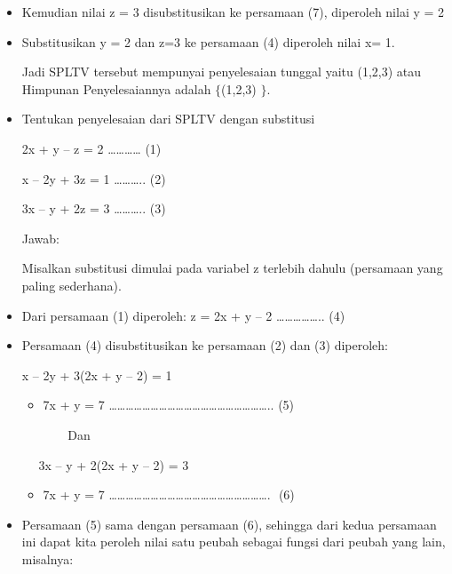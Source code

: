\documentclass[11pt,fleqn]{book} %
\begin{document}
\begin{myEnumerate}
	\noindent 
	\begin{itemize}
		\item Kemudian nilai z = 3 disubstitusikan ke persamaan (7), diperoleh nilai y = 2 \par
		\noindent 
		\item Substitusikan y = 2 dan z=3 ke persamaan (4) diperoleh nilai x= 1. \par
		\noindent 
		Jadi SPLTV tersebut mempunyai penyelesaian tunggal yaitu (1,2,3) atau Himpunan Penyelesaiannya adalah  $  \{  $(1,2,3) $  \}  $. \par
		\vspace{12pt}
		\vspace{12pt}
		\noindent 
		\item Tentukan penyelesaian dari SPLTV dengan substitusi \par
		2x + y – z = 2 ………… (1) \par
		x – 2y + 3z = 1 ……….. (2) \par
		3x – y + 2z = 3 ……….. (3) \par
		\noindent 
		Jawab: \par
		\noindent 
		Misalkan substitusi dimulai pada variabel z terlebih dahulu (persamaan yang paling sederhana). \par
		\noindent 
		\item Dari persamaan (1) diperoleh: z = 2x + y – 2 …………….. (4) \par
		\noindent 
		\item Persamaan (4) disubstitusikan ke persamaan (2) dan (3) diperoleh: \par
		x – 2y + 3(2x + y – 2) = 1 \par
		\begin{itemize}
			\item 7x + y = 7 ………………………………………………….. (5)\end{itemize}
		\par
		$  $ $  $ $  $ $  $ $  $ $  $ $  $ $  $ $  $ $  $ $  $ $  $Dan \par
		$  $ $  $ $  $ $  $ $  $3x – y + 2(2x + y – 2) = 3 \par
		\begin{itemize}
			\item 7x + y = 7 …………………………………………………. $  $ $  $(6)\end{itemize}
		\par
		\noindent 
		\item Persamaan (5) sama dengan persamaan (6), sehingga dari kedua persamaan ini dapat kita peroleh nilai satu peubah sebagai fungsi dari peubah yang lain, misalnya: \par

\end{itemize}
\end{myEnumerate}
\end{document}
